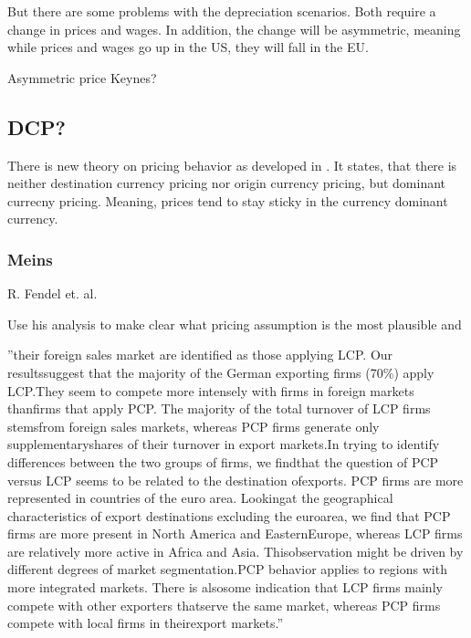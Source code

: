 But there are some problems with the depreciation scenarios. Both require a change in prices and wages. In addition, the change will be asymmetric, meaning while prices and wages go up in the US, they will fall in the EU.

Asymmetric price Keynes?

\subsection{DCP?}
There is new theory on pricing behavior as developed in \cite{casas2017dominant}. It states, that there is neither destination currency pricing nor origin currency pricing, but dominant currecny pricing. Meaning, prices tend to stay sticky in the currency dominant currency.  


\subsubsection{Meins}
R. Fendel et. al.

Use his analysis to make clear what pricing assumption is the most plausible and 

''their foreign sales market are identified as those applying LCP. Our resultssuggest that the majority of the German exporting firms (70\%) apply LCP.They seem to compete more intensely with firms in foreign markets thanfirms that apply PCP. The majority of the total turnover of LCP firms stemsfrom foreign sales markets, whereas PCP firms generate only supplementaryshares of their turnover in export markets.In trying to identify differences between the two groups of firms, we findthat the question of PCP versus LCP seems to be related to the destination ofexports. PCP firms are more represented in countries of the euro area. Lookingat the geographical characteristics of export destinations excluding the euroarea, we find that PCP firms are more present in North America and EasternEurope, whereas LCP firms are relatively more active in Africa and Asia. Thisobservation might be driven by different degrees of market segmentation.PCP behavior applies to regions with more integrated markets. There is alsosome indication that LCP firms mainly compete with other exporters thatserve the same market, whereas PCP firms compete with local firms in theirexport markets.''

